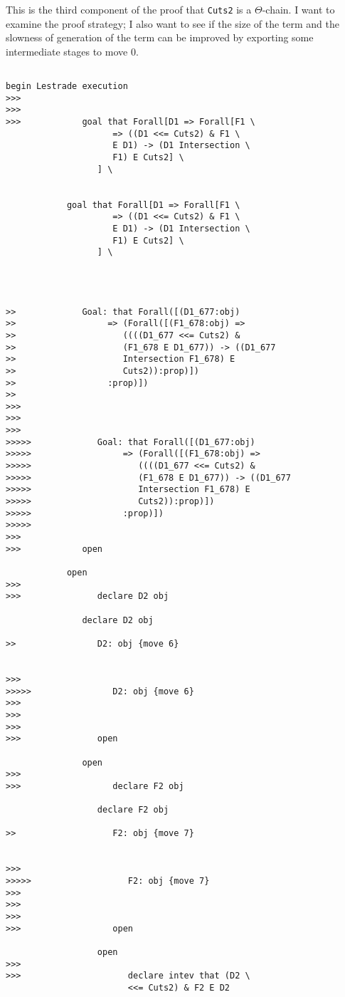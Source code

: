 \documentclass[12pt]{article}
\begin{document}
This is the third component of the proof that {\tt Cuts2} is a $\Theta$-chain.  I want to examine the proof strategy;  I also want to see if the size of the term and the slowness of generation of the term can be improved by exporting some intermediate stages to move 0.

\begin{verbatim}

begin Lestrade execution
>>>
>>>
>>>            goal that Forall[D1 => Forall[F1 \
                     => ((D1 <<= Cuts2) & F1 \
                     E D1) -> (D1 Intersection \
                     F1) E Cuts2] \
                  ] \
               

            goal that Forall[D1 => Forall[F1 \
                     => ((D1 <<= Cuts2) & F1 \
                     E D1) -> (D1 Intersection \
                     F1) E Cuts2] \
                  ] \
               



>>             Goal: that Forall([(D1_677:obj)
>>                  => (Forall([(F1_678:obj) =>
>>                     ((((D1_677 <<= Cuts2) &
>>                     (F1_678 E D1_677)) -> ((D1_677
>>                     Intersection F1_678) E
>>                     Cuts2)):prop)])
>>                  :prop)])
>>               
>>>
>>>
>>>
>>>>>             Goal: that Forall([(D1_677:obj)
>>>>>                  => (Forall([(F1_678:obj) =>
>>>>>                     ((((D1_677 <<= Cuts2) &
>>>>>                     (F1_678 E D1_677)) -> ((D1_677
>>>>>                     Intersection F1_678) E
>>>>>                     Cuts2)):prop)])
>>>>>                  :prop)])
>>>>>               
>>>
>>>            open

            open
>>>
>>>               declare D2 obj

               declare D2 obj

>>                D2: obj {move 6}


>>>
>>>>>                D2: obj {move 6}
>>>
>>>
>>>
>>>               open

               open
>>>
>>>                  declare F2 obj

                  declare F2 obj

>>                   F2: obj {move 7}


>>>
>>>>>                   F2: obj {move 7}
>>>
>>>
>>>
>>>                  open

                  open
>>>
>>>                     declare intev that (D2 \
                        <<= Cuts2) & F2 E D2


\end{verbatim}
\end{document}
